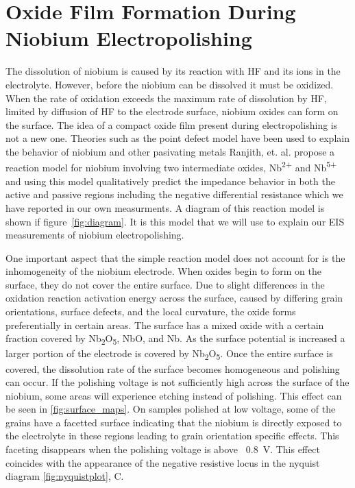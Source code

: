 \documentclass{revtex4-2}
\begin{document}
\section{Oxide Film Formation During Niobium Electropolishing}

The dissolution of niobium is caused by its reaction with HF and its ions in the electrolyte. However, before the niobium can be dissolved it must be oxidized. When the rate of oxidation exceeds the maximum rate of dissolution by HF, limited by diffusion of HF to the electrode surface, niobium oxides can form on the surface. The idea of a compact oxide film present during electropolishing is not a new one.\cite{Tian_2008,tian2008novel} Theories such as the point defect model have been used to explain the behavior of niobium and other pasivating metals\cite{bojinov1997ability, girginov2008conduction, bojinov2003evidence, macdonald1990theory, macdonald1992steady} Ranjith, et. al.\cite{ranjith2018anodic} propose a reaction model for niobium involving two intermediate oxides, Nb\textsuperscript{2+} and Nb\textsuperscript{5+} and using this model qualitatively predict the impedance behavior in both the active and passive regions including the negative differential resistance which we have reported in our own measurments. A diagram of this reaction model is shown if figure~\ref{fig:diagram}. It is this model that we will use to explain our EIS measurements of niobium electropolishing.

One important aspect that the simple reaction model does not account for is the inhomogeneity of the niobium electrode. When oxides begin to form on the surface, they do not cover the entire surface. Due to slight differences in the oxidation reaction activation energy across the surface, caused by differing grain orientations, surface defects, and the local curvature, the oxide forms preferentially in certain areas. The surface has a mixed oxide with a certain fraction covered by Nb\textsubscript{2}O\textsubscript{5}, NbO, and Nb. As the surface potential is increased a larger portion of the electrode is covered by Nb\textsubscript{2}O\textsubscript{5}. Once the entire surface is covered, the dissolution rate of the surface becomes homogeneous and polishing can occur. If the polishing voltage is not sufficiently high across the surface of the niobium, some areas will experience etching instead of polishing. This effect can be seen in \ref{fig:surface_maps}. On samples polished at low voltage, some of the grains have a facetted surface indicating that the niobium is directly exposed to the electrolyte in these regions leading to grain orientation specific effects. This faceting disappears when the polishing voltage is above ~\qty{0.8}{\volt}. This effect coincides with the appearance of the negative resistive locus in the nyquist diagram \ref{fig:nyquistplot}, C.
\end{document}
